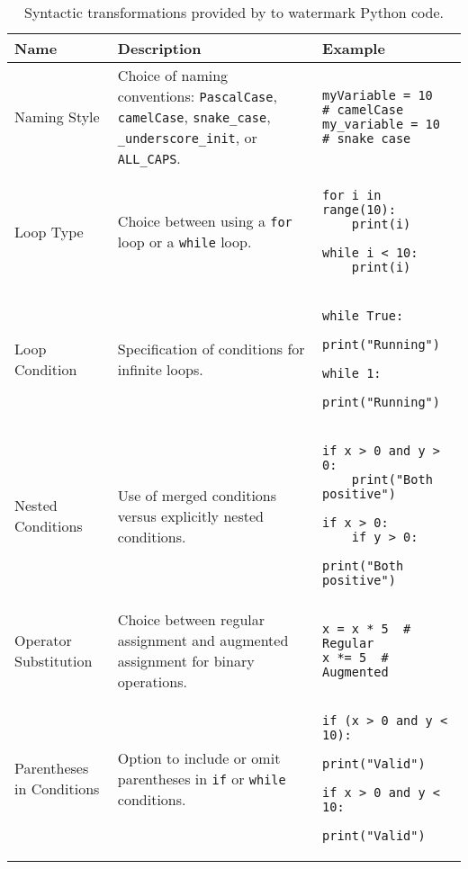 \begin{table}[!ht]
    \centering
    \small
    \renewcommand{\arraystretch}{1} %
    \begin{tabular}{|l|p{5cm}|p{6cm}|}
        \hline
        \textbf{Name} & \textbf{Description} & \textbf{Example} \\
        \hline
        Naming Style & {\small Choice of naming conventions: \texttt{PascalCase}, \texttt{camelCase}, \texttt{snake\_case}, \texttt{\_underscore\_init}, or \texttt{ALL\_CAPS}.} & {\small 
        \begin{verbatim}
myVariable = 10  # camelCase
my_variable = 10  # snake_case
        \end{verbatim}
        } \\
        \hline
        Loop Type & {\small Choice between using a \texttt{for} loop or a \texttt{while} loop.} & {\small 
        \begin{verbatim}
for i in range(10):
    print(i)

while i < 10:
    print(i)
        \end{verbatim}
        } \\
        \hline
        Loop Condition & {\small Specification of conditions for infinite loops.} & {\small 
        \begin{verbatim}
while True:
    print("Running")

while 1:
    print("Running")
        \end{verbatim}
        } \\
        \hline
        Nested Conditions & {\small Use of merged conditions versus explicitly nested conditions.} & {\small 
        \begin{verbatim}
if x > 0 and y > 0:
    print("Both positive")

if x > 0:
    if y > 0:
        print("Both positive")
        \end{verbatim}
        } \\
        \hline
        Operator Substitution & {\small Choice between regular assignment and augmented assignment for binary operations.} & {\small 
        \begin{verbatim}
x = x * 5  # Regular
x *= 5  # Augmented
        \end{verbatim}
        } \\
        \hline
        Parentheses in Conditions & {\small Option to include or omit parentheses in \texttt{if} or \texttt{while} conditions.} & {\small 
        \begin{verbatim}
if (x > 0 and y < 10):
    print("Valid")

if x > 0 and y < 10:
    print("Valid")
        \end{verbatim}
        } \\
        \hline
    \end{tabular}
    \caption{Syntactic transformations provided by \sys{} to watermark Python code. }
    \label{tab:code_style_options}
\end{table}





